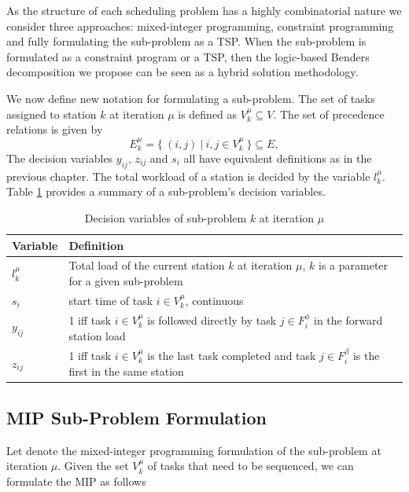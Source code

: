 As the structure of each scheduling problem has a 
highly combinatorial nature we consider 
three approaches:
mixed-integer programming, constraint
programming and fully formulating
the sub-problem as a TSP.
When the sub-problem is formulated
as a constraint program or a TSP,
then the logic-based Benders decomposition
we propose can be seen as a hybrid solution
methodology.

We now define new notation for formulating a
sub-problem.
The set of tasks assigned to station $k$
at iteration $\mu$ is defined as $V_k^\mu \subseteq V$.
The set of precedence relations is given by 
\[
	E_k^\mu = \{\: (i,j) \: | \: i,j \in V_k^\mu\:\} \subseteq E,
\]
The decision variables $y_{ij}$, $z_{ij}$ and $s_{i}$
all have equivalent definitions as in the previous chapter.
The total workload of a station is decided by the variable
$l_k^\mu$.
Table \ref{tab:bend:SPvars} provides a summary of a sub-problem's
decision variables.

\begin{table}[tbp]
	\def\arraystretch{1.1}
	\centering
	\caption{Decision variables of sub-problem $k$ at iteration $\mu$}
	\vspace{2mm}
	\begin{tabular}{lp{}}
		\toprule
		Variable & Definition \\\midrule\midrule
		$l_k^\mu$ & Total load of the current station $k$ at iteration $\mu$, $k$ is a parameter for a given sub-problem \\
		$s_i$ & start time of task $i\in V_k^\mu$, continuous \\
		$y_{ij}$ & 1 iff task $i \in V_k^\mu$ is followed directly by task $j \in F_i^\phi$ in the forward station load \\
		$z_{ij}$ & 1 iff task $i \in V_k^\mu$ is the last task completed and task $j \in F_i^\beta$ is the first in the same station \\
		\bottomrule
	\end{tabular}
	\label{tab:bend:SPvars}
\end{table}

\subsection{MIP Sub-Problem Formulation}
\label{sec:bend:mipForm}
Let \spmip{\mu} denote the mixed-integer programming
formulation of the sub-problem at iteration $\mu$.
Given the set $V_k^\mu$ of tasks that need to be sequenced,
we can formulate the MIP as follows

